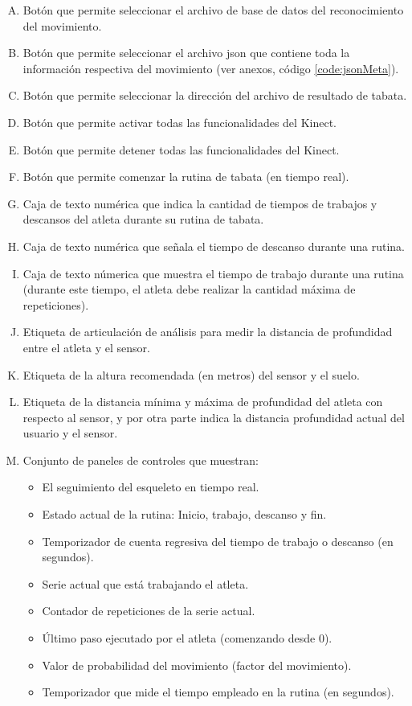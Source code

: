 \begin{enumerate}[A.]
    \item Bot\'on que permite seleccionar el archivo de base de datos del reconocimiento del movimiento.
    \item Bot\'on que permite seleccionar el archivo json que contiene toda la informaci\'on respectiva del movimiento (ver anexos, c\'odigo  \ref{code:jsonMeta}).
    \item Bot\'on que permite seleccionar la direcci\'on del archivo de resultado de tabata.
    \item Bot\'on que permite activar todas las funcionalidades del Kinect.    
    \item Bot\'on que permite detener todas las funcionalidades del Kinect. 
    \item Bot\'on que permite comenzar la rutina de tabata (en tiempo real).
   \item  Caja de texto num\'erica que indica la cantidad de tiempos de trabajos y descansos del atleta durante su rutina de tabata.
   \item  Caja de texto num\'erica que se\~nala el tiempo de descanso durante una rutina.
   \item  Caja de texto n\'umerica que muestra el tiempo de trabajo durante una rutina (durante este tiempo, el atleta debe realizar la cantidad m\'axima de repeticiones).
   \item  Etiqueta de articulaci\'on de an\'alisis para medir la distancia de profundidad entre el atleta y el sensor.
   \item  Etiqueta de la altura  recomendada (en metros)  del sensor y el suelo.
      \item  Etiqueta de la distancia m\'inima y m\'axima de profundidad del atleta con respecto al sensor, y por otra parte indica la distancia profundidad actual del usuario y el sensor.
      \item Conjunto de paneles de controles que muestran:
      \begin{itemize}
            \item  El seguimiento del esqueleto en tiempo real.
            \item  Estado actual de la rutina: Inicio, trabajo, descanso y fin.
            \item  Temporizador de cuenta regresiva del tiempo de trabajo o descanso (en segundos).
             \item  Serie actual que est\'a trabajando el atleta.
             \item  Contador de repeticiones de la serie actual.
              \item \'Ultimo paso ejecutado por el atleta (comenzando desde 0).   
             \item  Valor de probabilidad del movimiento (factor del movimiento).
             \item  Temporizador que mide el tiempo    empleado en la rutina (en segundos).
      \end{itemize}
\end{enumerate}
